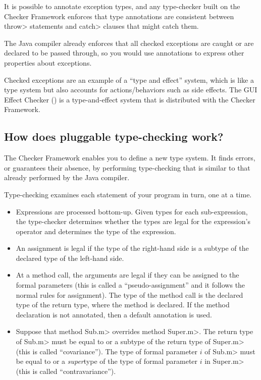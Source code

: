 It is possible to annotate exception types, and any type-checker built on the
Checker Framework enforces that type annotations are consistent between
\<throw> statements and \<catch> clauses that might catch them.

The Java compiler already enforces that all checked exceptions are caught
or are declared to be passed through, so you would use annotations to
express other properties about exceptions.

Checked exceptions are an example of a ``type and effect'' system, which is
like a type system but also accounts for actions/behaviors such as side
effects.  The GUI Effect Checker () is a
type-and-effect system that is distributed with the Checker Framework.


\subsection{How does pluggable type-checking work?\label{faq-pluggable-type-checking}}

The Checker Framework enables you to define a new type system.  It finds
errors, or guarantees their absence, by performing type-checking that is
similar to that already performed by the Java compiler.

Type-checking examines each statement of your program in turn, one at a time.
\begin{itemize}
\item
Expressions are processed bottom-up.  Given types for each sub-expression,
the type-checker determines whether the types are legal for the
expression's operator and determines the type of the expression.

\item
An assignment is legal if the type of the right-hand side is a subtype of
the declared type of the left-hand side.

\item
 At a method call, the arguments are legal if they can be assigned to the
 formal parameters (this is called a ``pseudo-assignment'' and it follows
 the normal rules for assignment).  The type of the method call is the
 declared type of the return type, where the method is declared.  If
 the method declaration is not annotated, then a default annotation is
 used.

\item
  Suppose that method \<Sub.m> overrides method \<Super.m>.
  The return type of \<Sub.m> must be equal to or a subtype of the return
  type of \<Super.m> (this is called ``covariance'').
  The type of formal parameter $i$ of \<Sub.m> must be equal to or a
  \emph{super}type of the type of formal parameter $i$ in \<Super.m> (this
  is called ``contravariance'').

\end{itemize}


